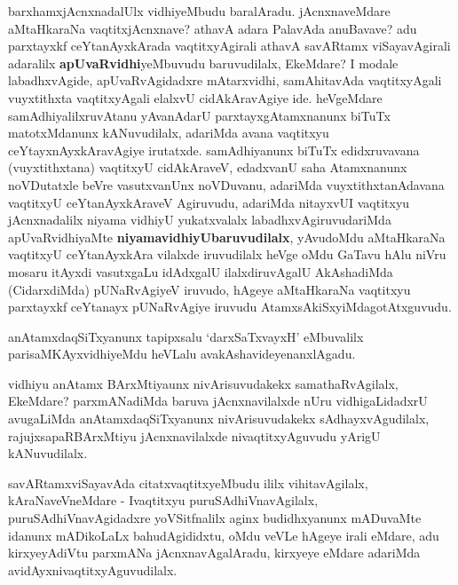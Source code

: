 \centerline{}

\begin{artha}
barxhamxjAcnxnadalUlx vidhiyeMbudu baralAradu. jAcnxnaveMdare aMtaHkaraNa
vaqtitxjAcnxnave? athavA adara PalavAda anuBavave? adu
parxtayxkf ceYtanAyxkArada \-vaqtitxyAgirali athavA savARtamx
viSayavAgirali adaralilx \textbf{apUvaRvidhi}yeMbu\-vudu baruvudilalx,
EkeMdare? I modale labadhxvAgide, apUvaRvAgidadxre mAtarx\-vidhi,
samAhitavAda vaqtitxyAgali vuyxtithxta vaqtitxyAgali elalxvU
cidAkAravAgiye ide. heVgeMdare samAdhiyalilxruvAtanu yAvanAdarU
parxtayxgAtamxnanunx biTuTx matotxMdanunx kANuvudilalx, adariMda avana
vaqtitxyu ceYtayxnAyxkAravAgiye irutatxde. samAdhiyanunx biTuTx
edidxruvavana (vuyxtithxtana) vaqtitxyU cidAkAraveV, edadxvanU saha
Atamxnanunx noVDutatxle beVre vasutxvanUnx noVDuvanu, adariMda
vuyxtithxtanAdavana vaqtitxyU ceYtanAyxkAraveV Agiruvudu, adariMda
nitayxvUI vaqtitxyu  jAcnxnadalilx niyama vidhiyU yukatxvalalx
labadhxvAgiruvudariMda apUvaRvidhiyaMte
\textbf{niyamavidhiyUbaruvudilalx}, yAvudoMdu aMtaHkaraNa vaqtitxyU
ceYtanAyxkAra vilalxde iruvudilalx heVge oMdu GaTavu hAlu niVru mosaru
itAyxdi vasutxgaLu idAdxgalU ilalxdiruvAgalU AkAshadiMda (CidarxdiMda)
pUNaRvAgiyeV iruvudo, hAgeye aMtaHkaraNa vaqtitxyu parxtayxkf
ceYtanayx pUNaRvAgiye iruvudu AtamxsAkiSxyiMdagotAtxguvudu.
\end{artha}

\centerline{}

\begin{artha}
anAtamxdaqSiTxyanunx tapipxsalu `darxSaTxvayxH' eMbuvalilx
parisaMKAyxvidhiyeMdu heVLalu avakAshavideyenanxlAgadu.

vidhiyu anAtamx BArxMtiyaunx nivArisuvudakekx samathaRvAgilalx,
EkeMdare? \-parxmANadiMda baruva jAcnxnavilalxde nUru vidhigaLidadxrU
avugaLiMda anAtamxdaqSiTx\-yanunx nivArisuvudakekx sAdhayxvAgudilalx,
rajujxsapaRBArxMtiyu jAcnxnavilalxde nivaqtitxyAguvudu yArigU kANuvudilalx.
\end{artha}

\begin{artha}
savARtamxviSayavAda citatxvaqtitxyeMbudu ililx vihitavAgilalx,
kAraNaveV\-neMdare - Ivaqtitxyu puruSAdhiVnavAgilalx,
puruSAdhiVnavAgidadxre yoVSitfnalilx aginx budidhxyanunx mADuvaMte
idanunx mADikoLaLx bahudAgididxtu, oMdu veVLe hAgeye irali eMdare,
adu kirxyeyAdiVtu parxmANa jAcnxnavAgalAradu, kirxyeye eMdare adariMda avidAyxnivaqtitxyAguvudilalx.
\end{artha}


